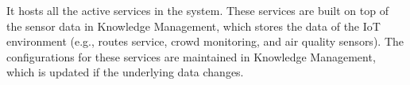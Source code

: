 It hosts all the active services in the system. These services are built on top of the sensor data in Knowledge Management, which stores the data of the IoT environment (e.g., routes service, crowd monitoring, and air quality sensors). The configurations for these services are maintained in Knowledge Management, which is updated if the underlying data changes.